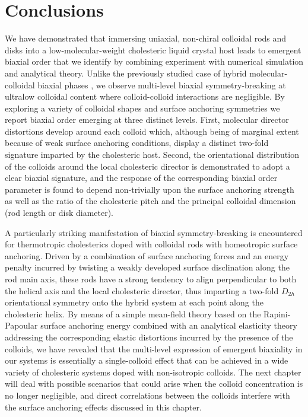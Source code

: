  


\section{Conclusions}


We have  demonstrated that immersing uniaxial, non-chiral colloidal rods and disks into a low-molecular-weight cholesteric liquid crystal host leads to emergent biaxial order that we identify by combining experiment with numerical simulation and analytical theory. Unlike the previously studied case of hybrid molecular-colloidal biaxial phases \cite{liu2016,mundoor2021,mundoor2018}, we observe multi-level biaxial symmetry-breaking at ultralow colloidal content where colloid-colloid interactions are negligible. By exploring a variety of colloidal shapes and surface anchoring symmetries we report biaxial order emerging at three distinct levels. First, molecular director distortions develop around each colloid which, although being of marginal extent because of weak surface anchoring conditions, display a distinct two-fold signature imparted by the cholesteric host. Second, the orientational distribution of the colloids around the local cholesteric director is demonstrated to adopt a clear biaxial signature, and the response of the corresponding biaxial order parameter is found to depend non-trivially upon the surface anchoring strength as well as the ratio of the cholesteric pitch and the principal colloidal dimension (rod length or disk diameter). 

A particularly striking manifestation of biaxial symmetry-breaking is encountered for thermotropic cholesterics doped with colloidal rods with homeotropic surface anchoring. Driven by a combination of surface anchoring forces and an energy penalty incurred by twisting a weakly developed surface disclination along the rod main axis, these rods have a strong tendency to align perpendicular to both the helical axis and the local cholesteric director, thus imparting a two-fold $D_{2h}$ orientational symmetry onto the hybrid system at each point along the cholesteric helix.
By means of a simple mean-field theory based on the Rapini-Papoular surface anchoring energy combined with an analytical elasticity theory addressing the corresponding elastic distortions incurred by the presence of the colloids, we have revealed that the multi-level expression of emergent biaxiality in our systems is essentially a single-colloid effect that can be achieved in a wide variety of cholesteric systems doped with non-isotropic colloids. The next chapter will deal with possible scenarios that could arise when the colloid concentration is no longer negligible, and direct correlations between the colloids interfere with the surface anchoring effects discussed in this chapter. 




\clearpage